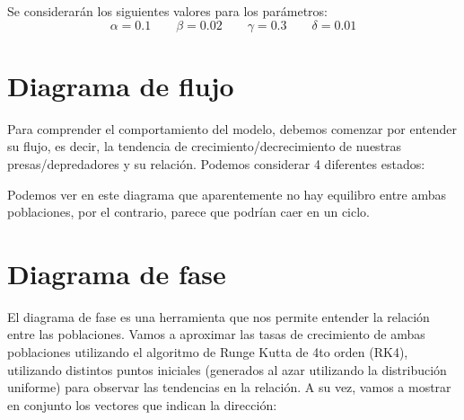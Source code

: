 \documentclass [a4paper,12pt,oneside,final]{article}
\begin{document}
Se considerarán los siguientes valores para los parámetros:
\[ \alpha = 0.1 \qquad \beta = 0.02 \qquad \gamma = 0.3 \qquad \delta = 0.01 \]


\section{Diagrama de flujo}

Para comprender el comportamiento del modelo, debemos comenzar por entender su flujo, es decir, la tendencia de crecimiento/decrecimiento de nuestras presas/depredadores y su relación.
Podemos considerar 4 diferentes estados:

\begin{center}
\end{center}

Podemos ver en este diagrama que aparentemente no hay equilibro entre ambas poblaciones, por el contrario, parece que podrían caer en un ciclo.

\section{Diagrama de fase}

El diagrama de fase es una herramienta que nos permite entender la relación entre las poblaciones. Vamos a aproximar las tasas de crecimiento de ambas poblaciones utilizando el algoritmo de Runge Kutta de 4to orden (RK4), utilizando distintos puntos iniciales (generados al azar utilizando la distribución uniforme) para observar las tendencias en la relación. A su vez, vamos a mostrar en conjunto los vectores que indican la dirección:
\end{document}
